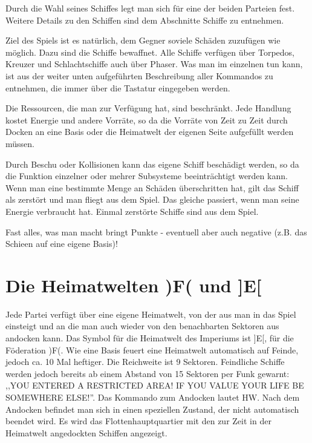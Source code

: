 \normalsize

Durch die Wahl seines Schiffes legt man sich f\"ur eine der beiden Parteien
fest. Weitere Details zu den Schiffen sind dem Abschnitte Schiffe zu entnehmen.


Ziel des Spiels ist es nat\"urlich, dem Gegner soviele Sch\"aden 
zuzuf\"ugen wie
m\"oglich. Dazu sind die Schiffe bewaffnet. Alle Schiffe verf\"ugen \"uber
Torpedos, Kreuzer und Schlachtschiffe auch \"uber Phaser. Was man im 
einzelnen tun
kann, ist aus der weiter unten aufgef\"uhrten Beschreibung aller
Kommandos zu entnehmen,
die immer \"uber die Tastatur eingegeben werden.

Die Ressourcen, die man zur Verf\"ugung hat, sind beschr\"ankt. Jede Handlung
kostet Energie und andere Vorr\"ate, so da\3 die Vorr\"ate von Zeit zu Zeit
durch Docken an eine Basis oder die Heimatwelt
der eigenen Seite aufgef\"ullt werden m\"ussen.

Durch Beschu\3 oder Kollisionen kann das eigene Schiff besch\"adigt werden,
so da\3 die Funktion einzelner oder mehrer Subsysteme beeintr\"achtigt werden
kann. Wenn man eine bestimmte Menge an Sch\"aden \"uberschritten hat, gilt
das Schiff als zerst\"ort und man fliegt aus dem Spiel. Das gleiche passiert,
wenn man seine Energie verbraucht hat. Einmal zerst\"orte Schiffe sind aus dem
Spiel.

Fast alles, was man macht bringt Punkte - eventuell aber auch negative 
(z.B. das Schie\3en auf eine eigene Basis)!


\section{Die Heimatwelten )F( und ]E[}

Jede Partei verf\"ugt \"uber eine eigene Heimatwelt, von der aus man in
das Spiel einsteigt und an die man auch wieder 
von den benachbarten Sektoren aus andocken kann. Das Symbol f\"ur die
Heimatwelt des Imperiums ist ]E[, f\"ur die F\"oderation )F(. Wie eine
Basis feuert eine Heimatwelt automatisch auf Feinde, jedoch ca. 10 Mal 
heftiger. Die Reichweite ist 9 Sektoren. Feindliche Schiffe werden jedoch
bereits ab einem Abstand von 15 Sektoren per Funk gewarnt: 
,,YOU ENTERED A RESTRICTED AREA! IF YOU VALUE YOUR LIFE BE SOMEWHERE ELSE!''.
Das Kommando zum Andocken lautet HW. Nach dem Andocken befindet man sich in
einen speziellen Zustand, der nicht automatisch beendet wird. Es wird das
Flottenhauptquartier mit den zur Zeit in der Heimatwelt angedockten Schiffen
angezeigt. 

